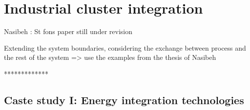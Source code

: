 \section{Industrial cluster integration}

Nasibeh : St fons paper still under revision

Extending the system boundaries, considering the exchange between process and the rest of the system => use the examples from the thesis of Nasibeh

*************

\subsection{Caste study I: Energy integration technologies}